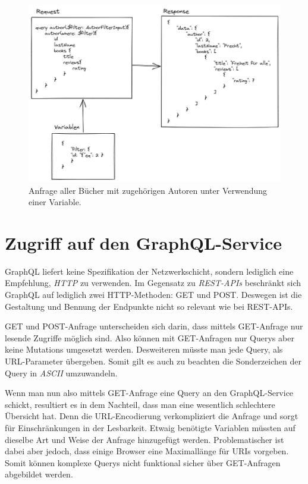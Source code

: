 \begin{figure}[H]
    \includegraphics[width=\textwidth]{pics/book_request_with_parameter.png}
    \caption{Anfrage aller Bücher mit zugehörigen Autoren unter Verwendung einer Variable.}
\end{figure}

\section{Zugriff auf den GraphQL-Service}
GraphQL liefert keine Spezifikation der Netzwerkschicht, sondern lediglich eine Empfehlung, \textit{HTTP} zu verwenden.
Im Gegensatz zu \textit{REST-APIs} beschränkt sich GraphQL auf lediglich zwei HTTP-Methoden: GET und POST.
Deswegen ist die Gestaltung und Bennung der Endpunkte nicht so relevant wie bei REST-APIs.
\newline

GET und POST-Anfrage unterscheiden sich darin, dass mittels GET-Anfrage nur lesende Zugriffe möglich sind.
Also können mit GET-Anfragen nur Querys aber keine Mutations umgesetzt werden.
Desweiteren müsste man jede Query, als URL-Parameter übergeben.
Somit gilt es auch zu beachten die Sonderzeichen der Query in \textit{ASCII} umzuwandeln.
\newline

Wenn man nun also mittels GET-Anfrage eine Query an den GraphQL-Service schickt, resultiert es in dem Nachteil, dass man eine wesentlich schlechtere Übersicht hat. 
Denn die URL-Encodierung verkompliziert die Anfrage und sorgt für Einschränkungen in der Lesbarkeit.
Etwaig benötigte Variablen müssten auf dieselbe Art und Weise der Anfrage hinzugefügt werden.
Problematischer ist dabei aber jedoch, dass einige Browser eine Maximallänge für URIs vorgeben.
Somit können komplexe Querys nicht funktional sicher über GET-Anfragen abgebildet werden.
\newline

